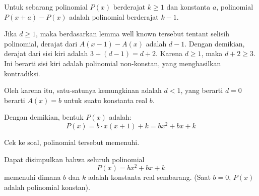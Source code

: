 \begin{solusi}
    \begin{lemma*}
    Untuk sebarang polinomial $P(x)$ berderajat $k \ge 1$ dan konstanta $a$, polinomial $P(x+a)-P(x)$ adalah polinomial berderajat $k-1$.
    \end{lemma*}
    
    Jika $d \ge 1$, maka berdasarkan lemma well known tersebut tentant selisih polinomial, derajat dari $A(x-1)-A(x)$ adalah $d-1$. Dengan demikian, derajat dari sisi kiri adalah $3 + (d-1) = d+2$. Karena $d \ge 1$, maka $d+2 \ge 3$. Ini berarti sisi kiri adalah polinomial non-konstan, yang menghasilkan kontradiksi.
     
    Oleh karena itu, satu-satunya kemungkinan adalah $d < 1$, yang berarti $d=0$ berarti $A(x)=b$ untuk suatu konstanta real $b$.
    
    Dengan demikian, bentuk $P(x)$ adalah:
    \[ P(x) = b \cdot x(x+1) + k = bx^2 + bx + k \]
    
    Cek ke soal, polinomial tersebut memenuhi.
    
    Dapat disimpulkan bahwa seluruh polinomial
    \[ P(x) = bx^2 + bx + k \]
    memenuhi dimana $b$ dan $k$ adalah konstanta real sembarang. (Saat $b=0$, $P(x)$ adalah polinomial konstan).

\end{solusi}